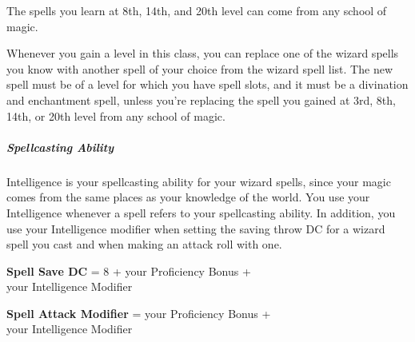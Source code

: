 \documentclass[letterpaper,openany,twoside,twocolumn]{book}
\begin{document}
	The spells you learn at 8th, 14th, and 20th level can come from any school of magic.
	
	Whenever you gain a level in this class, you can replace one of the wizard spells you know with another spell of your choice from the wizard spell list. The new spell must be of a level for which you have spell slots, and it must be a divination and enchantment spell, unless you’re replacing the spell you gained at 3rd, 8th, 14th, or 20th level from any school of magic.
	
	\subparagraph*{Spellcasting Ability}
	Intelligence is your spellcasting ability for your wizard spells, since your magic comes from the same places as your knowledge of the world. You use your Intelligence whenever a spell refers to your spellcasting ability. In addition, you use your Intelligence modifier when setting the saving throw DC for a wizard spell you cast and when making an attack roll with one.
	
	\begin{center}
		\textbf{Spell Save DC} = 8 + your Proficiency Bonus + \\your Intelligence Modifier
	\end{center}
	\begin{center}
		\textbf{Spell Attack Modifier} = your Proficiency Bonus + \\your Intelligence Modifier
	\end{center}
	
\end{document}
